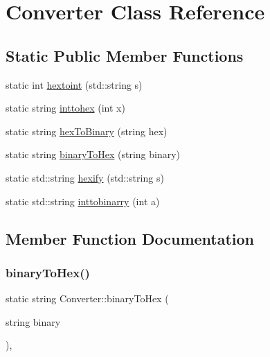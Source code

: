 \hypertarget{class_converter}{}\section{Converter Class Reference}
\label{class_converter}
\subsection*{Static Public Member Functions}
\begin{DoxyCompactItemize}
\item 
static int \mbox{\hyperlink{class_converter_a144e272d3905a27f6eb214e76f9b6b5f}{hextoint}} (std\+::string s)
\item 
static string \mbox{\hyperlink{class_converter_a02f64183ea19c2d2671252cadb17f66f}{inttohex}} (int x)
\item 
static string \mbox{\hyperlink{class_converter_aabed706cd6259a3d1c5c303cf2a411ff}{hex\+To\+Binary}} (string hex)
\item 
static string \mbox{\hyperlink{class_converter_a27f709c876d1b9283bf8cf0cd54e5578}{binary\+To\+Hex}} (string binary)
\item 
static std\+::string \mbox{\hyperlink{class_converter_a768192ad785d9cc92a0815b85ba5653f}{hexify}} (std\+::string s)
\item 
static std\+::string \mbox{\hyperlink{class_converter_aceba1af9f263ae93e9e2b7f4f291c72b}{inttobinarry}} (int a)
\end{DoxyCompactItemize}


\subsection{Member Function Documentation}
\mbox{\label{class_converter_a27f709c876d1b9283bf8cf0cd54e5578}} 
\subsubsection{\texorpdfstring{binary\+To\+Hex()}{binaryToHex()}}
{\footnotesize\ttfamily static string Converter\+::binary\+To\+Hex (\begin{DoxyParamCaption}\item[{string}]{binary }\end{DoxyParamCaption})\hspace{0.3cm}{\ttfamily [inline]}, {\ttfamily [static]}}

